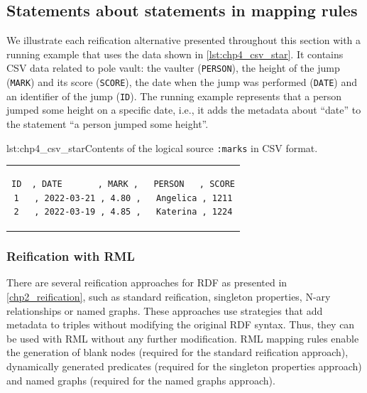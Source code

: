 
\subsection{Statements about statements in mapping rules}
\label{sec:chp4_reif_mappings}

We illustrate each reification alternative presented throughout this section with a running example that uses the data shown in \cref{lst:chp4_csv_star}.
It contains CSV data related to pole vault:
the vaulter (\texttt{PERSON}),
the height of the jump (\texttt{MARK}) and its score (\texttt{SCORE}),
the date when the jump was performed (\texttt{DATE}) and
an identifier of the jump (\texttt{ID}).
The running example represents
that a person jumped some height on a specific date, i.e., it adds the metadata about ``date''
to the statement ``a person jumped some height''.

\noindent\hspace{0.15\linewidth}\begin{minipage}{\linewidth}
\begin{captionedlisting}{lst:chp4_csv_star}{Contents of the logical source \texttt{:marks} in CSV format.}
\centering
\begin{tabular}{c}
\hspace{3em}
{\begin{lstlisting}[basicstyle=\ttfamily\small,label={list:example1},columns=flexible]
ID  , DATE       , MARK ,   PERSON   , SCORE
1   , 2022-03-21 , 4.80 ,   Angelica , 1211
2   , 2022-03-19 , 4.85 ,   Katerina , 1224
\end{lstlisting}}
\end{tabular}
\end{captionedlisting}
\end{minipage}

\subsubsection{Reification with RML}

There are several reification approaches for RDF as presented in \cref{chp2_reification}, such as standard reification, singleton properties, N-ary relationships or named graphs. 
These approaches use strategies that add metadata to triples
without modifying the original RDF syntax.
Thus, they can be used with RML without any further modification. RML mapping rules enable the generation of blank nodes (required for the standard reification approach), dynamically generated predicates (required for the singleton properties approach) and named graphs (required for the named graphs approach). %

